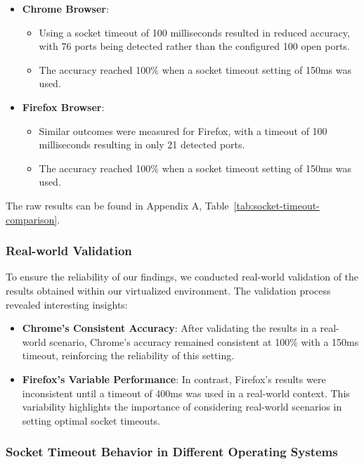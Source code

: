 \begin{itemize}
    \item \textbf{Chrome Browser}:
    \begin{itemize}
        \item Using a socket timeout of 100 milliseconds resulted in reduced accuracy, with 76 ports being detected rather than the configured 100 open ports.
        \item The accuracy reached 100\% when a socket timeout setting of 150ms was used.
    \end{itemize}
    
    \item \textbf{Firefox Browser}:
    \begin{itemize}
        \item Similar outcomes were measured for Firefox, with a timeout of 100 milliseconds resulting in only 21 detected ports.
        \item The accuracy reached 100\% when a socket timeout setting of 150ms was used.
    \end{itemize}
\end{itemize}

The raw results can be found in Appendix A, Table~\ref{tab:socket-timeout-comparison}.

\subsubsection{Real-world Validation}

To ensure the reliability of our findings, we conducted real-world validation of the results obtained within our virtualized environment. The validation process revealed interesting insights:

\begin{itemize}
    \item \textbf{Chrome's Consistent Accuracy}: After validating the results in a real-world scenario, Chrome's accuracy remained consistent at 100\% with a 150ms timeout, reinforcing the reliability of this setting.
    
    \item \textbf{Firefox's Variable Performance}: In contrast, Firefox's results were inconsistent until a timeout of 400ms was used in a real-world context. This variability highlights the importance of considering real-world scenarios in setting optimal socket timeouts.
\end{itemize}


\subsubsection{Socket Timeout Behavior in Different Operating Systems}
\label{section:socket-timeout-comparison}

